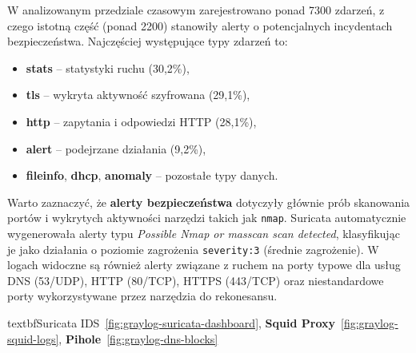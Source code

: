 \documentclass[
    left=2.5cm,         %
    right=2.5cm,        %
    top=2.5cm,          %
    bottom=3cm,         %
    bindingoffset=6mm,  %
    nohyphenation=true %
]{eiti/eiti-thesis} %
\begin{document}
W analizowanym przedziale czasowym zarejestrowano ponad 7300 zdarzeń, z czego istotną część (ponad 2200) stanowiły alerty o potencjalnych incydentach bezpieczeństwa. Najczęściej występujące typy zdarzeń to:
\begin{itemize}
    \item \textbf{stats} – statystyki ruchu (30,2\%),
    \item \textbf{tls} – wykryta aktywność szyfrowana (29,1\%),
    \item \textbf{http} – zapytania i odpowiedzi HTTP (28,1\%),
    \item \textbf{alert} – podejrzane działania (9,2\%),
    \item \textbf{fileinfo}, \textbf{dhcp}, \textbf{anomaly} – pozostałe typy danych.
\end{itemize}

Warto zaznaczyć, że \textbf{alerty bezpieczeństwa} dotyczyły głównie prób skanowania portów i wykrytych aktywności narzędzi takich jak \texttt{nmap}. Suricata automatycznie wygenerowała alerty typu \textit{Possible Nmap or masscan scan detected}, klasyfikując je jako działania o poziomie zagrożenia \texttt{severity:3} (średnie zagrożenie). W logach widoczne są również alerty związane z ruchem na porty typowe dla usług DNS (53/UDP), HTTP (80/TCP), HTTPS (443/TCP) oraz niestandardowe porty wykorzystywane przez narzędzia do rekonesansu.

textbf{Suricata IDS}~\ref{fig:graylog-suricata-dashboard}, \textbf{Squid Proxy}~\ref{fig:graylog-squid-logs}, \textbf{Pihole}~\ref{fig:graylog-dns-blocks}
\end{document}
